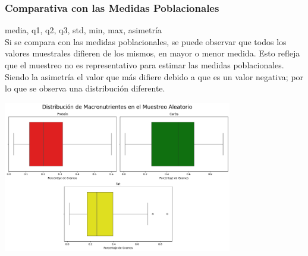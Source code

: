\documentclass[12pt,a4paper]{article}
\begin{document}
    \subsubsection{Comparativa con las Medidas Poblacionales}
        media, q1, q2, q3, std, min, max, asimetría\\
        Si se compara con las medidas poblacionales, se puede observar que todos 
        los valores muestrales difieren de los mismos, en mayor o menor medida. 
        Esto refleja que el muestreo no es representativo para estimar las medidas 
        poblacionales. Siendo la asimetría el valor que más difiere debido a que es 
        un valor negativa; por lo que se observa una distribución diferente.
        \begin{center}
            \includegraphics[width=0.75\textwidth]{Resources/3_02_plot_01.png}
        \end{center}

\newpage
\end{document}
